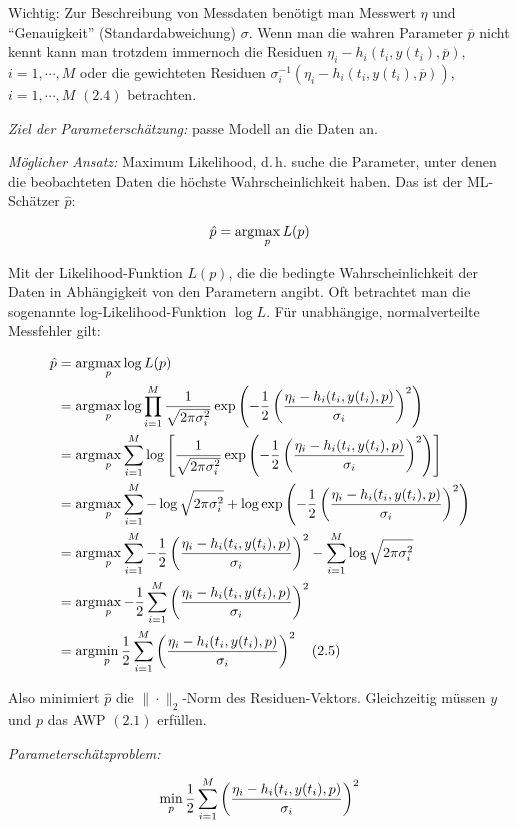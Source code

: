 Wichtig: Zur Beschreibung von Messdaten benötigt man Messwert $\eta$ und "`Genauigkeit"' (Standardabweichung) $\sigma$. Wenn man die wahren Parameter $\overline p$ nicht kennt kann man trotzdem immernoch die Residuen $\eta_i-h_i(t_i,y(t_i), \overline p)$, $i=1,\cdots,M$ oder die gewichteten Residuen $\sigma_i^{-1}(\eta_i-h_i(t_i,y(t_i), \overline p))$, $i=1,\cdots,M$ $(2.4)$  betrachten.

\emph{Ziel der Parameterschätzung:} passe Modell an die Daten an.

\emph{Möglicher Ansatz:} Maximum Likelihood, d.\,h. suche die Parameter, unter denen die beobachteten Daten die höchste Wahrscheinlichkeit haben. Das ist der ML-Schätzer $\hat p$:

\[\hat p = \arg\!\max_p L(p)\]

Mit der Likelihood-Funktion $L(p)$, die die bedingte Wahrscheinlichkeit der Daten in Abhängigkeit von den Parametern angibt. Oft betrachtet man die sogenannte log-Likelihood-Funktion $\log L$. Für unabhängige, normalverteilte Messfehler gilt:

\begin{align*}
\hat p &= \arg\!\max_p \log L(p)\\
&= \arg\!\max_p \log \prod_{i=1}^M \frac 1{\sqrt{2\pi \sigma_i^2}} \exp\left( -\frac 12 \left(\frac{\eta_i-h_i(t_i,y(t_i),p)}{\sigma_i} \right)^2 \right) \\
&= \arg\!\max_p \sum_{i=1}^M \log \left[\frac 1{\sqrt{2\pi \sigma_i^2}} \exp\left( -\frac 12 \left(\frac{\eta_i-h_i(t_i,y(t_i),p)}{\sigma_i} \right)^2 \right)\right] \\
&= \arg\!\max_p \sum_{i=1}^M -\log \sqrt{2\pi \sigma_i^2} + \log \exp\left( -\frac 12 \left(\frac{\eta_i-h_i(t_i,y(t_i),p)}{\sigma_i} \right)^2 \right) \\
&= \arg\!\max_p \sum_{i=1}^M -\frac 12 \left(\frac{\eta_i-h_i(t_i,y(t_i),p)}{\sigma_i} \right)^2 - \sum_{i=1}^M \log \sqrt{2\pi \sigma_i^2} \\
&= \arg\!\max_p - \frac 12 \sum_{i=1}^M \left(\frac{\eta_i-h_i(t_i,y(t_i),p)}{\sigma_i} \right)^2 \\
&= \arg\!\min_p \frac 12 \sum_{i=1}^M \left(\frac{\eta_i-h_i(t_i,y(t_i),p)}{\sigma_i} \right)^2 \quad (2.5)\\
\end{align*}

Also minimiert $\hat p$ die $\|\cdot\|_2$-Norm des Residuen-Vektors. Gleichzeitig müssen $y$ und $p$ das AWP $(2.1)$ erfüllen.

\emph{Parameterschätzproblem:}

\[\min_p \frac 12 \sum_{i=1}^M \left(\frac{\eta_i - h_i(t_i,y(t_i),p)}{\sigma_i}\right)^2\]

